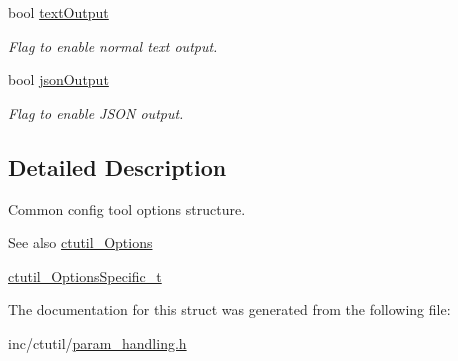 \begin{DoxyCompactItemize}
\hypertarget{structctutil__OptionsCommon_ac51657c7de191de6ac297cdd381400ad}{}\label{structctutil__OptionsCommon_ac51657c7de191de6ac297cdd381400ad} 
bool \hyperlink{structctutil__OptionsCommon_ac51657c7de191de6ac297cdd381400ad}{text\+Output}
\begin{DoxyCompactList}\small\item\em Flag to enable normal text output. \end{DoxyCompactList}\item 
\hypertarget{structctutil__OptionsCommon_ac177afec5b609ef5a9465fc6dd5a01ef}{}\label{structctutil__OptionsCommon_ac177afec5b609ef5a9465fc6dd5a01ef} 
bool \hyperlink{structctutil__OptionsCommon_ac177afec5b609ef5a9465fc6dd5a01ef}{json\+Output}
\begin{DoxyCompactList}\small\item\em Flag to enable J\+S\+ON output. \end{DoxyCompactList}\end{DoxyCompactItemize}


\subsection{Detailed Description}
Common config tool options structure. \begin{DoxySeeAlso}{See also}
\hyperlink{structctutil__Options}{ctutil\+\_\+\+Options} 

\hyperlink{param__handling_8h_a658c8227d546be5c7f560dc8edf07915}{ctutil\+\_\+\+Options\+Specific\+\_\+t} 
\end{DoxySeeAlso}


The documentation for this struct was generated from the following file\+:\begin{DoxyCompactItemize}
\item 
inc/ctutil/\hyperlink{param__handling_8h}{param\+\_\+handling.\+h}\end{DoxyCompactItemize}
